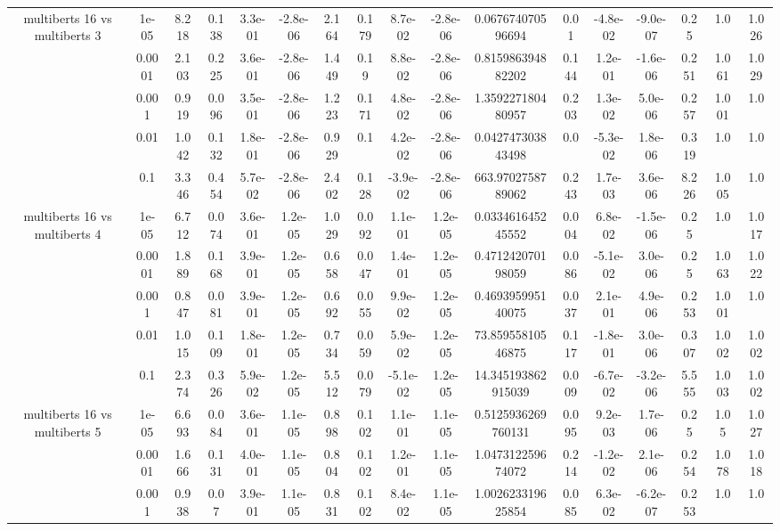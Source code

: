 \begin{tabular}{|c|c|c|c|c|c|c|c|c|c|c|c|c|c|c|c|c|}
\hline
\multirow{5}{*}{multiberts 16 vs multiberts 3} & 1e-05 & 8.218 & 0.138 & 3.3e-01 & -2.8e-06 & 2.164 & 0.179 & 8.7e-02 & -2.8e-06 & 0.067674070596694 & 0.01 & -4.8e-02 & -9.0e-07 & 0.25 & 1.0 & 1.026 \\
 & 0.0001 & 2.103 & 0.225 & 3.6e-01 & -2.8e-06 & 1.449 & 0.19 & 8.8e-02 & -2.8e-06 & 0.815986394882202 & 0.144 & 1.2e-01 & -1.6e-06 & 0.251 & 1.061 & 1.029 \\
 & 0.001 & 0.919 & 0.096 & 3.5e-01 & -2.8e-06 & 1.223 & 0.171 & 4.8e-02 & -2.8e-06 & 1.359227180480957 & 0.203 & 1.3e-02 & 5.0e-06 & 0.257 & 1.001 & 1.0 \\
 & 0.01 & 1.042 & 0.132 & 1.8e-01 & -2.8e-06 & 0.929 & 0.1 & 4.2e-02 & -2.8e-06 & 0.042747303843498 & 0.0 & -5.3e-02 & 1.8e-06 & 0.319 & 1.0 & 1.0 \\
 & 0.1 & 3.346 & 0.454 & 5.7e-02 & -2.8e-06 & 2.402 & 0.128 & -3.9e-02 & -2.8e-06 & 663.9702758789062 & 0.243 & 1.7e-03 & 3.6e-06 & 8.226 & 1.005 & 1.0 \\
\hline
\multirow{5}{*}{multiberts 16 vs multiberts 4} & 1e-05 & 6.712 & 0.074 & 3.6e-01 & 1.2e-05 & 1.029 & 0.092 & 1.1e-01 & 1.2e-05 & 0.033461645245552 & 0.004 & 6.8e-02 & -1.5e-06 & 0.25 & 1.0 & 1.017 \\
 & 0.0001 & 1.889 & 0.168 & 3.9e-01 & 1.2e-05 & 0.658 & 0.047 & 1.4e-01 & 1.2e-05 & 0.471242070198059 & 0.086 & -5.1e-02 & 3.0e-06 & 0.25 & 1.063 & 1.022 \\
 & 0.001 & 0.847 & 0.081 & 3.9e-01 & 1.2e-05 & 0.692 & 0.055 & 9.9e-02 & 1.2e-05 & 0.469395995140075 & 0.037 & 2.1e-01 & 4.9e-06 & 0.253 & 1.001 & 1.0 \\
 & 0.01 & 1.015 & 0.109 & 1.8e-01 & 1.2e-05 & 0.734 & 0.059 & 5.9e-02 & 1.2e-05 & 73.85955810546875 & 0.117 & -1.8e-01 & 3.0e-06 & 0.307 & 1.002 & 1.002 \\
 & 0.1 & 2.374 & 0.326 & 5.9e-02 & 1.2e-05 & 5.512 & 0.079 & -5.1e-02 & 1.2e-05 & 14.345193862915039 & 0.009 & -6.7e-02 & -3.2e-06 & 5.555 & 1.003 & 1.002 \\
\hline
\multirow{5}{*}{multiberts 16 vs multiberts 5} & 1e-05 & 6.693 & 0.084 & 3.6e-01 & 1.1e-05 & 0.898 & 0.102 & 1.1e-01 & 1.1e-05 & 0.5125936269760131 & 0.095 & 9.2e-03 & 1.7e-06 & 0.25 & 1.05 & 1.027 \\
 & 0.0001 & 1.666 & 0.131 & 4.0e-01 & 1.1e-05 & 0.804 & 0.102 & 1.2e-01 & 1.1e-05 & 1.047312259674072 & 0.214 & -1.2e-02 & 2.1e-06 & 0.254 & 1.078 & 1.018 \\
 & 0.001 & 0.938 & 0.07 & 3.9e-01 & 1.1e-05 & 0.831 & 0.102 & 8.4e-02 & 1.1e-05 & 1.002623319625854 & 0.085 & 6.3e-02 & -6.2e-07 & 0.253 & 1.0 & 1.0 \\

\end{tabular}

